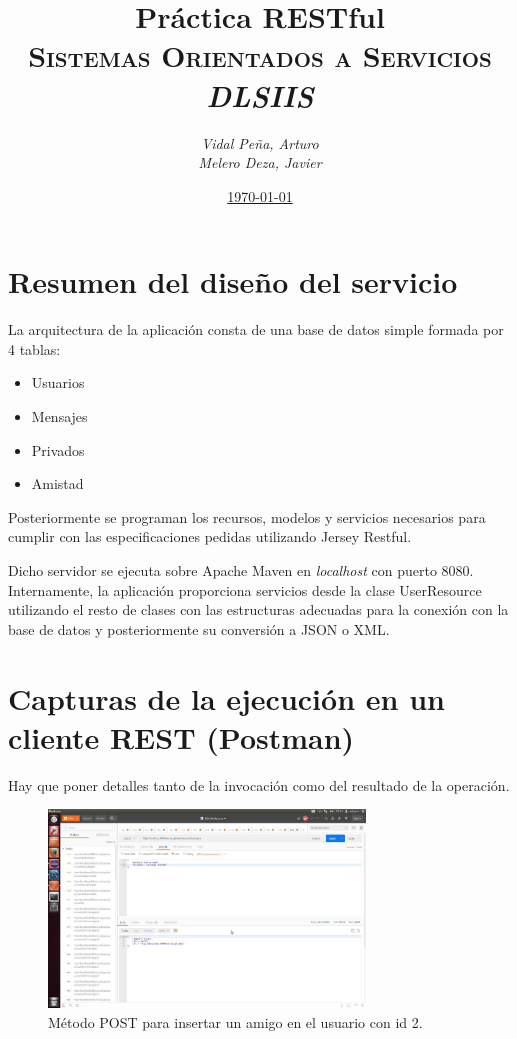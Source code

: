 \documentclass[12pt,a4paper, spanish]{article}
\title{\textbf{Práctica RESTful} \\
       \textsc{Sistemas Orientados a Servicios} \\
       \emph{DLSIIS}}
\author{\emph{Vidal Peña, Arturo}\\
        \emph{Melero Deza, Javier}}
\date{\underline{\today}}
\begin{document}
\maketitle
\thispagestyle{empty}
\renewcommand*\contentsname{Índice de contenidos}
\tableofcontents
\pagebreak


\section{Resumen del diseño del servicio}
La arquitectura de la aplicación consta de una base de datos simple formada por 4 tablas:

\begin{itemize}
	\item Usuarios
	\item Mensajes
	\item Privados
	\item Amistad
\end{itemize}

Posteriormente se programan los recursos, modelos y servicios necesarios para cumplir con las especificaciones pedidas utilizando Jersey Restful. \newline

Dicho servidor se ejecuta sobre Apache Maven en \textit{localhost} con puerto 8080. Internamente, la aplicación proporciona servicios desde la clase UserResource utilizando el resto de clases con las estructuras adecuadas para la conexión con la base de datos y posteriormente su conversión a JSON o XML.

\newpage
\section{Capturas de la ejecución en un cliente REST (Postman)}
Hay que poner detalles tanto de la invocación como del resultado de la operación.

\begin{figure}[H]
	\centering
	\includegraphics[width=0.75\textwidth]{images/captura1.jpg}
	\caption{Método POST para insertar un amigo en el usuario con id 2.}
\end{figure}
\end{document}
